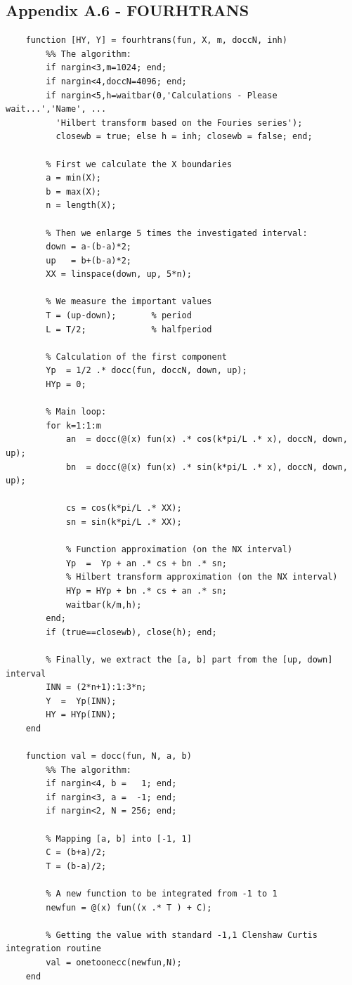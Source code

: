 \documentclass[12pt,twoside,a4paper]{article}
\numberwithin{equation}{subsection}
\numberwithin{figure}{subsection}
\begin{document}
\subsection*{Appendix A.6 - FOURHTRANS}
\begin{lstlisting}
	function [HY, Y] = fourhtrans(fun, X, m, doccN, inh)
	    %% The algorithm:
	    if nargin<3,m=1024; end;
	    if nargin<4,doccN=4096; end;
	    if nargin<5,h=waitbar(0,'Calculations - Please wait...','Name', ...
	      'Hilbert transform based on the Fouries series'); 
	      closewb = true; else h = inh; closewb = false; end;
	
	    % First we calculate the X boundaries
	    a = min(X);       
	    b = max(X);
	    n = length(X);
	
	    % Then we enlarge 5 times the investigated interval:
	    down = a-(b-a)*2; 
	    up   = b+(b-a)*2;
	    XX = linspace(down, up, 5*n);
	
	    % We measure the important values
	    T = (up-down);       % period
	    L = T/2;             % halfperiod
	
	    % Calculation of the first component
	    Yp  = 1/2 .* docc(fun, doccN, down, up);
	    HYp = 0;
	
	    % Main loop:
	    for k=1:1:m
	        an  = docc(@(x) fun(x) .* cos(k*pi/L .* x), doccN, down, up);
	        bn  = docc(@(x) fun(x) .* sin(k*pi/L .* x), doccN, down, up);
	
	        cs = cos(k*pi/L .* XX);
	        sn = sin(k*pi/L .* XX);
	        
	        % Function approximation (on the NX interval)
	        Yp  =  Yp + an .* cs + bn .* sn;
	        % Hilbert transform approximation (on the NX interval)
	        HYp = HYp + bn .* cs + an .* sn;
	        waitbar(k/m,h);
	    end; 
	    if (true==closewb), close(h); end;
	
	    % Finally, we extract the [a, b] part from the [up, down] interval
	    INN = (2*n+1):1:3*n;
	    Y  =  Yp(INN); 
	    HY = HYp(INN); 
	end
	
	function val = docc(fun, N, a, b)    
	    %% The algorithm:
	    if nargin<4, b =   1; end;
	    if nargin<3, a =  -1; end;
	    if nargin<2, N = 256; end;
	
	    % Mapping [a, b] into [-1, 1]
	    C = (b+a)/2;
	    T = (b-a)/2;
	    
	    % A new function to be integrated from -1 to 1    
	    newfun = @(x) fun((x .* T ) + C);
	
	    % Getting the value with standard -1,1 Clenshaw Curtis integration routine
	    val = onetoonecc(newfun,N);
	end
	    

\end{lstlisting}
\end{document}
